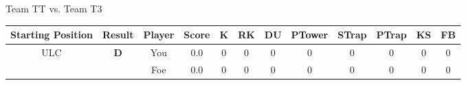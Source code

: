 \documentclass[a4paper,12pt]{article}
\begin{document}
  \vspace*{2em}
  \par {\large {\color{Gray} Team} TT {\color{Gray}
      vs. Team} T3}
  \newline
  \begin{tabular}[t]{| c | c | c | c | c | c | c | c | c | c | c | c
      |}
    \hline
    Starting Position & \textbf{Result} & Player & \textbf{Score} & K & RK & DU & PTower & STrap & PTrap & KS & FB \\
    
      
                      
      
                      
      
                      
      
                      
      
                      
      
                      
      
                      
      
                      
      
                      
      
                      
      
                      
      
        \hline
        \multirow{2}{*}{  ULC  } &
              \multirow{2}{*}{  
                  \textbf{D}  } & 
                    \cellcolor{yellow!25} You & \cellcolor{yellow!25} 0.0 & \cellcolor{yellow!25} 0 &
                    \cellcolor{yellow!25} 0 & \cellcolor{yellow!25} 0 & \cellcolor{yellow!25} 0 &
                    \cellcolor{yellow!25} 0 & \cellcolor{yellow!25} 0 & \cellcolor{yellow!25} 0 &
                    \cellcolor{yellow!25} 0 \\
                    \cline{3-12}
                    & & \cellcolor{red!15} Foe & \cellcolor{red!15} 0.0 & \cellcolor{red!15} 0 & \cellcolor{red!15}
                    0 & \cellcolor{red!15} 0
                    & \cellcolor{red!15} 0 & \cellcolor{red!15}
                    0 & \cellcolor{red!15} 0 
                    & \cellcolor{red!15} 0 & \cellcolor{red!15}
                    0 \\
                    
                      
      
                      
      

\end{tabular}
\end{document}
